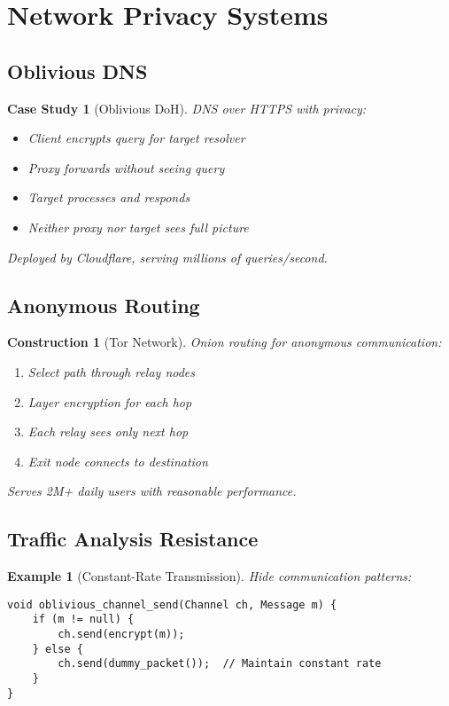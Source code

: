 \documentclass[11pt,final]{article}
\newtheorem{example}[theorem]{Example}
\newtheorem{construction}[theorem]{Construction}
\newtheorem{casestudy}[theorem]{Case Study}
\begin{document}
\section{Network Privacy Systems}

\subsection{Oblivious DNS}

\begin{casestudy}[Oblivious DoH]
DNS over HTTPS with privacy:
\begin{itemize}
    \item Client encrypts query for target resolver
    \item Proxy forwards without seeing query
    \item Target processes and responds
    \item Neither proxy nor target sees full picture
\end{itemize}
Deployed by Cloudflare, serving millions of queries/second.
\end{casestudy}

\subsection{Anonymous Routing}

\begin{construction}[Tor Network]
Onion routing for anonymous communication:
\begin{enumerate}
    \item Select path through relay nodes
    \item Layer encryption for each hop
    \item Each relay sees only next hop
    \item Exit node connects to destination
\end{enumerate}
Serves 2M+ daily users with reasonable performance.
\end{construction}

\subsection{Traffic Analysis Resistance}

\begin{example}[Constant-Rate Transmission]
Hide communication patterns:
\begin{verbatim}
void oblivious_channel_send(Channel ch, Message m) {
    if (m != null) {
        ch.send(encrypt(m));
    } else {
        ch.send(dummy_packet());  // Maintain constant rate
    }
}
\end{verbatim}
\end{example}
\end{document}
